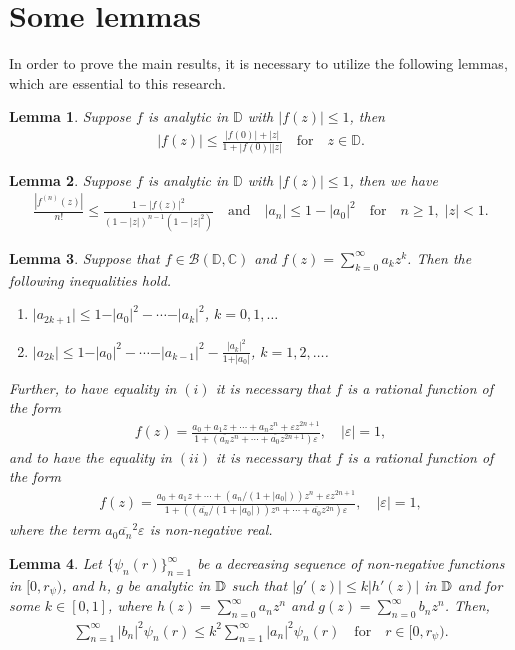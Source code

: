 \documentclass[11pt,reqno]{amsart}
\newtheorem{lem}{Lemma}[section]
\newtheorem{open problem}{Open problem}[section]
\newcommand{\ol}{\overline}
\newcommand{\beas}{\begin{eqnarray*}}
\newcommand{\eeas}{\end{eqnarray*}}
\renewcommand{\epsilon}{\varepsilon}
\numberwithin{equation}{section}
\begin{document}
\section{Some lemmas}
In order to prove the main results, it is necessary to utilize the following lemmas, which are essential to this research.
\begin{lem}\label{lem1} \cite[Pick's invariant form of Schwarz’s lemma]{K2006} Suppose $f$ is analytic in $\mathbb{D}$ with $|f(z)|\leq1$, then 
\beas |f(z)|\leq \frac{|f(0)|+|z|}{1+|f(0)||z|}\quad\text{for}\quad z\in\mathbb{D}.\eeas\end{lem}
\begin{lem}\cite{DP2008}\label{lem2} Suppose $f$ is analytic in $\mathbb{D}$ with $|f(z)|\leq1$, then we have
\beas \frac{\left|f^{(n)}(z)\right|}{n!}\leq \frac{1-|f(z)|^2}{(1-|z|)^{n-1}(1-|z|^2)}\quad\text{and}\quad |a_n|\leq 1-|a_0|^2\quad\text{for}\quad n\geq 1,\;|z|<1.\eeas\end{lem}
\begin{lem}\label{lem3}\cite{C1940}\cite[Lemma B]{PVW2020} Suppose that $f\in\mathcal{B}(\mathbb{D},\mathbb{C})$ and $f(z) = \sum_{k=0}^\infty a_kz^k$. Then the following inequalities hold.
\begin{enumerate}
\item[(i)] $\vert a_{2k+1}\vert\leq 1-\vert a_0\vert^2-\cdots-\vert a_k\vert^2$, $k=0,1,\ldots$
\item[(ii)] $\vert a_{2k}\vert\leq 1-\vert a_0\vert^2-\cdots-\vert a_{k-1}\vert^2-\frac{\vert a_k\vert^2}{1+\vert a_0\vert}$, $k=1,2,\ldots$.
\end{enumerate}
Further, to have equality in $(i)$ it is necessary that $f$ is a rational function of the form 
\beas f(z)=\frac{a_0+a_1z+\cdots+a_nz^n+\epsilon z^{2n+1}}{1+(\ol{a_n}z^n+\cdots+\ol{a_0}z^{2n+1})\epsilon},\quad|\epsilon|=1,\eeas
and to have the equality in $(ii)$ it is necessary that $f$ is a rational function of the form 
\beas f(z)=\frac{a_0+a_1z+\cdots+(a_n/(1+|a_0|))z^n+\epsilon z^{2n+1}}{1+((\ol{a_n}/(1+|a_0|))z^n+\cdots+\ol{a_0}z^{2n})\epsilon},\quad|\epsilon|=1,\eeas
where the term $a_0\ol{a_n}^2\epsilon$ is non-negative real.
\end{lem}
\begin{lem}\label{lem4}\cite{PVW2021} Let $\{\psi_n(r)\}_{n=1}^\infty$ be a decreasing sequence of non-negative functions in $[0,r_\psi)$, and $h$, $g$ be analytic in $\Bbb{D}$ such that $|g'(z)|\leq k|h'(z)|$ in $\Bbb{D}$ and for some $k\in[0,1]$, where $h(z)=\sum_{n=0}^\infty a_n z^n$ and $g(z)=\sum_{n=0}^\infty b_n z^n$. Then, 
\beas \sum_{n=1}^\infty |b_n|^2 \psi_n(r)\leq k^2\sum_{n=1}^\infty |a_n|^2 \psi_n(r)\quad\text{for}\quad r\in[0,r_\psi).\eeas\end{lem}
\end{document}
